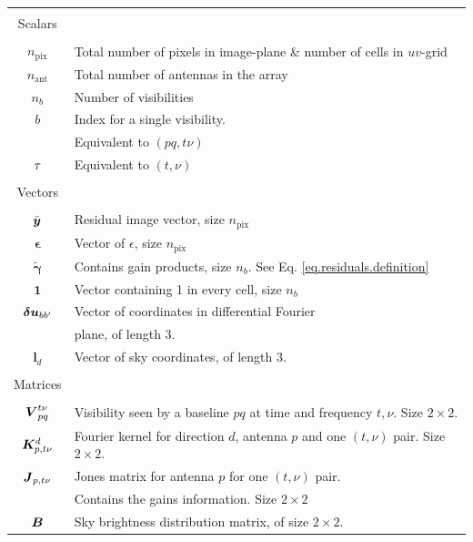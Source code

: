 \begin{table}[t!]
\begin{tabular}{c l}
\hline
&\\
Scalars & \\
\cline{1-1}
&\\
$n_{\mathrm{pix}}$ & Total number of pixels in image-plane \& number of cells in $uv$-grid\\
$n_{\mathrm{ant}}$ & Total number of antennas in the array\\
$n_b$     & Number of visibilities\\
$b$       & Index for a single visibility.\\
& Equivalent to $\left(pq,t\nu\right)$\\
$\tau$ & Equivalent to $\left(t,\nu\right)$\\
&\\
Vectors & \\
\cline{1-1}
&\\
$\tilde{\bm{{{y}}}}$  & Residual image vector, size $n_{\mathrm{pix}}$\\
$\bm{\epsilon}$       & {Vector of $\epsilon$, size $n_{\mathrm{pix}}$}\\ 
$\bm{\widetilde{\gamma}}$ & Contains  gain products, size $n_b$. See Eq. \ref{eq.residuals.definition}\\
$\mathbf{1}$ & Vector containing 1 in every cell, size $n_b$\\
$\bm{\delta u}_{bb'}$ & Vector of coordinates in differential Fourier\\ & plane, of length $3$.\\
$\bm{l}_d$          & Vector of sky coordinates, of length $3$.\\
&\\
Matrices&\\
\cline{1-1}
&\\
$\bm{{V}}_{pq}^{t\nu}$       & Visibility seen by a baseline $pq$ at time and frequency $t,\nu$. Size $2\times 2$.\\
$\bm{K}_{p,t\nu}^d$& Fourier kernel for direction $d$, antenna $p$ and one $\left(t,\nu\right)$ pair. Size $2 \times 2$.\\
$\bm{{J}}_{p,t\nu}$     & Jones matrix for antenna $p$ for one $\left(t,\nu\right)$ pair.\\
& Contains the gains  information. Size $2 \times 2$\\
$\bm{{B}}_{}$        & Sky brightness distribution matrix, of size $2 \times 2$.\\

\end{tabular}
\end{table}

